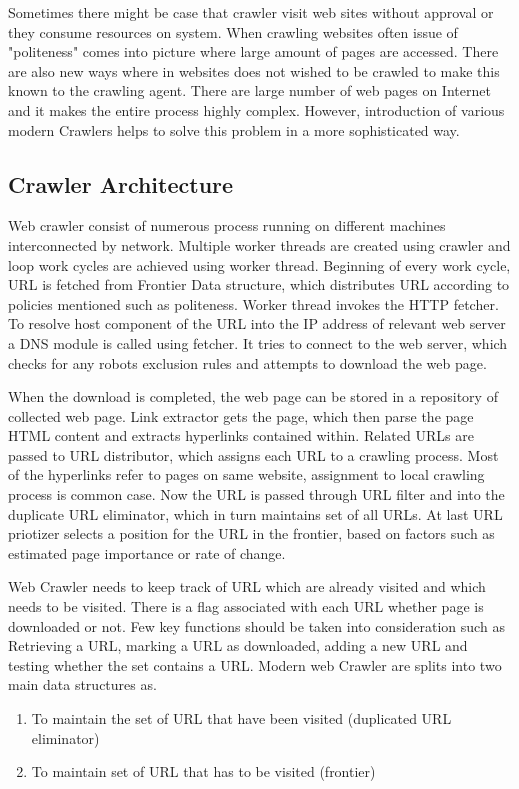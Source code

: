 \documentclass[article,type=msc,colorback,accentcolor=tud9c,twoside,11pt]{tudthesis}
\begin{document}
Sometimes there might be case that crawler visit web sites without approval or they consume resources on system. When crawling websites often issue of "politeness" comes into picture where large amount of pages are accessed. There are also new ways where in websites does not wished to be crawled to make this known to the crawling agent. There are large number of web pages on Internet and it makes the entire process highly complex. However, introduction of various modern Crawlers helps to solve this problem in a more sophisticated way.

\subsection{Crawler Architecture}

Web crawler consist of numerous process running on different machines interconnected by network. Multiple worker threads are created using crawler and loop work cycles are achieved using worker thread. Beginning of every work cycle, URL is fetched from Frontier Data structure,  which distributes URL according to policies mentioned such as politeness. Worker thread invokes the HTTP fetcher. To resolve host component of the URL into the IP address of relevant web server a DNS module is called using fetcher. It tries to connect to the web server, which checks for any robots exclusion rules and attempts to download the web page.
	
 When the download is completed, the web page can be stored in a repository of collected web page. Link extractor gets the page, which then parse the page HTML content and extracts hyperlinks contained within. Related URLs are passed to URL distributor, which assigns each URL to a crawling process. Most of the hyperlinks refer to pages on same website, assignment to local crawling process is common case. Now the URL is passed through URL filter and into the duplicate URL eliminator, which in turn maintains set of all URLs.  At last URL priotizer selects a position for the URL in the frontier, based on factors such as estimated page importance or rate of change.
 
Web Crawler needs to keep track of URL which are already visited and which needs to be visited. There is a flag associated with each URL whether page is downloaded or not. Few key functions should be taken into consideration such as Retrieving a URL, marking a URL as downloaded, adding a new URL and testing whether the set contains a URL. Modern web Crawler are splits into two main data structures as. 
 \begin{enumerate}
\item To maintain the set of URL that have been visited (duplicated URL eliminator)
\item To maintain set of URL that has to be visited (frontier)
\end{enumerate}
\end{document}
